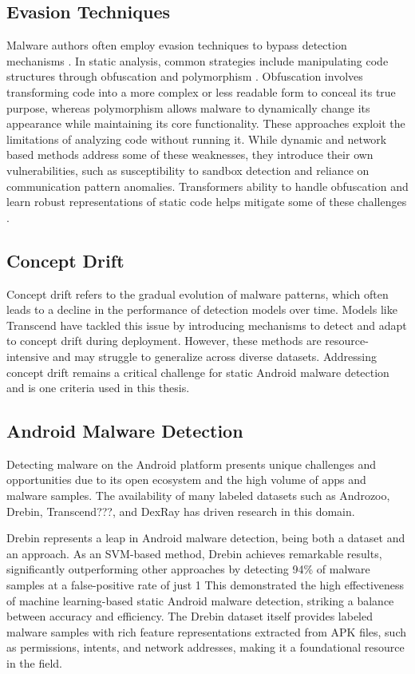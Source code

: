 \subsection{Evasion Techniques}
Malware authors often employ evasion techniques to bypass detection mechanisms \cite{vorlesung}.
In static analysis, common strategies include manipulating code structures through obfuscation \cite{obfuscation} and polymorphism \cite{polymorhism}.
Obfuscation involves transforming code into a more complex or less readable form to conceal its true purpose, whereas polymorphism allows malware to dynamically change its appearance while maintaining its core functionality.
These approaches exploit the limitations of analyzing code without running it.
While dynamic and network based methods address some of these weaknesses, they introduce their own vulnerabilities, such as susceptibility to sandbox detection and reliance on communication pattern anomalies.
Transformers ability to handle obfuscation and learn robust representations of static code helps mitigate some of these challenges \cite{deobfuscation}.

\subsection{Concept Drift}
Concept drift refers to the gradual evolution of malware patterns, which often leads to a decline in the performance of detection models over time.
Models like Transcend \cite{transcend} have tackled this issue by introducing mechanisms to detect and adapt to concept drift during deployment.
However, these methods are resource-intensive and may struggle to generalize across diverse datasets.
Addressing concept drift remains a critical challenge for static Android malware detection and is one criteria used in this thesis.

\subsection{Android Malware Detection}
Detecting malware on the Android platform presents unique challenges and opportunities due to its open ecosystem and the high volume of apps and malware samples.
The availability of many labeled datasets such as Androzoo, Drebin, Transcend???, and DexRay has driven research in this domain.

Drebin \cite{drebin} represents a leap in Android malware detection, being both a dataset and an approach.
As an SVM-based method, Drebin achieves remarkable results, significantly outperforming other approaches by detecting 94\% of malware samples at a false-positive rate of just 1%
This demonstrated the high effectiveness of machine learning-based static Android malware detection, striking a balance between accuracy and efficiency.
The Drebin dataset itself provides labeled malware samples with rich feature representations extracted from APK files, such as permissions, intents, and network addresses, making it a foundational resource in the field.

